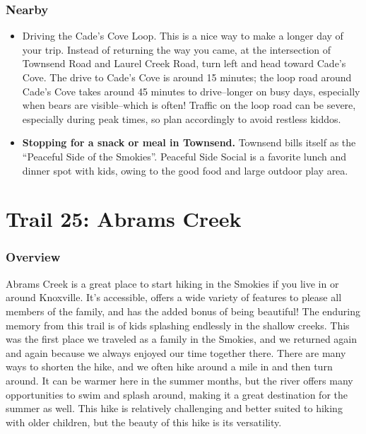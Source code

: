 \documentclass[
  letterpaper,
  DIV=11,
  numbers=noendperiod]{scrreprt}
\providecommand{\tightlist}{%
  \setlength{\itemsep}{0pt}\setlength{\parskip}{0pt}}\usepackage{longtable,booktabs,array}
\begin{document}
\subsection{Nearby}\label{nearby-23}

\begin{itemize}
\tightlist
\item
  Driving the Cade's Cove Loop. This is a nice way to make a longer day
  of your trip. Instead of returning the way you came, at the
  intersection of Townsend Road and Laurel Creek Road, turn left and
  head toward Cade's Cove. The drive to Cade's Cove is around 15
  minutes; the loop road around Cade's Cove takes around 45 minutes to
  drive--longer on busy days, especially when bears are visible--which
  is often! Traffic on the loop road can be severe, especially during
  peak times, so plan accordingly to avoid restless kiddos.
\item
  \textbf{Stopping for a snack or meal in Townsend.} Townsend bills
  itself as the ``Peaceful Side of the Smokies''. Peaceful Side Social
  is a favorite lunch and dinner spot with kids, owing to the good food
  and large outdoor play area.
\end{itemize}

\chapter{Trail 25: Abrams Creek}\label{trail-25-abrams-creek}

\subsection{Overview}\label{overview-25}

Abrams Creek is a great place to start hiking in the Smokies if you live
in or around Knoxville. It's accessible, offers a wide variety of
features to please all members of the family, and has the added bonus of
being beautiful! The enduring memory from this trail is of kids
splashing endlessly in the shallow creeks. This was the first place we
traveled as a family in the Smokies, and we returned again and again
because we always enjoyed our time together there. There are many ways
to shorten the hike, and we often hike around a mile in and then turn
around. It can be warmer here in the summer months, but the river offers
many opportunities to swim and splash around, making it a great
destination for the summer as well. This hike is relatively challenging
and better suited to hiking with older children, but the beauty of this
hike is its versatility.
\end{document}
